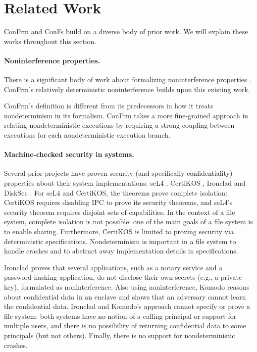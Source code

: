\section{Related Work}

ConFrm and ConFs build on a diverse body of prior work. We will explain these works throughout this section. 

\paragraph{Noninterference properties.} There is a significant body of work about formalizing noninterference properties \cite{19, 25, 26, 29, 30, 32, disksec}. ConFrm’s relatively deterministic noninterference builds upon this existing work. 

ConFrm’s definition is different from its predecessors in how it treats nondeterminism in its formalism. ConFrm takes a more fine-grained approach in relating nondeterministic executions by requiring a strong coupling between executions for each nondeterministic execution branch. 

\paragraph{Machine-checked security in systems.} 
Several prior projects have proven security (and specifically confidentiality) properties about their system implementations: seL4 \cite{23, 26}, CertiKOS \cite{15}, Ironclad \cite{20} and DiskSec \cite{disksec}. For seL4 and CertiKOS, the theorems prove complete isolation: CertiKOS requires disabling IPC to prove its security theorems, and seL4’s security theorem requires disjoint sets of capabilities. In the context of a file system, complete isolation is not possible: one of the main goals of a file system is to enable sharing. Furthermore, CertiKOS is limited to proving security via deterministic specifications. Nondeterminism is important in a file system to handle crashes and to abstract away implementation details in specifications. 


Ironclad proves that several applications, such as a notary service and a password-hashing application, do not disclose their own secrets (e.g., a private key), formulated as noninterference. Also using noninterference, Komodo \cite{17} reasons about confidential data in an enclave and shows that an adversary cannot learn the confidential data. Ironclad and Komodo’s approach cannot specify or prove a file system: both systems have no notion of a calling principal or support for multiple users, and there is no possibility of returning confidential data to some principals (but not others). Finally, there is no support for nondeterministic crashes.


